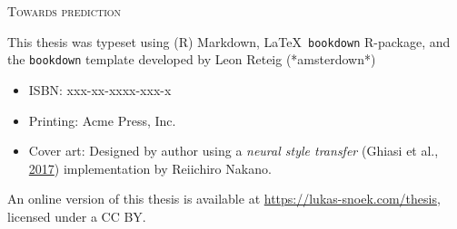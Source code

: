\documentclass[11pt,american,a4paper,oneside,]{memoir} %
\newcommand{\CoverName}{cover} %
\begin{document}

\setlength{\abstitleskip}{-\absparindent}

\pagestyle{empty}
\renewcommand{\thepage}{\CoverName} %


\frontmatter
\thispagestyle{empty}
\def\drop{.1\textheight}

\vspace*{\drop}
\begin{center}
\Huge \textsc{Towards prediction}
\end{center}

\clearpage
\thispagestyle{empty}
\vspace*{\fill}
\begingroup %
\small
\setlength{\parskip}{\baselineskip} %
\setlength\parindent{0pt} %

This thesis was typeset using (R) Markdown, \LaTeX\, \verb+bookdown+ R-package, and the \verb+bookdown+ template developed by Leon Reteig (*amsterdown*)

\begin{itemize}[label={}, itemsep=0pt, partopsep=0pt, topsep=-\parskip, parsep=0pt, leftmargin=1em]
  \item ISBN: xxx-xx-xxxx-xxx-x 
  \item Printing: Acme Press, Inc. 
  \item Cover art: Designed by author using a \emph{neural style transfer} (Ghiasi et al., \protect\hyperlink{ref-ghiasi2017exploring}{2017}) implementation by Reiichiro Nakano. 
\end{itemize}

An online version of this thesis is available at \url{https://lukas-snoek.com/thesis}, licensed under a CC BY.
\endgroup
\end{document}
